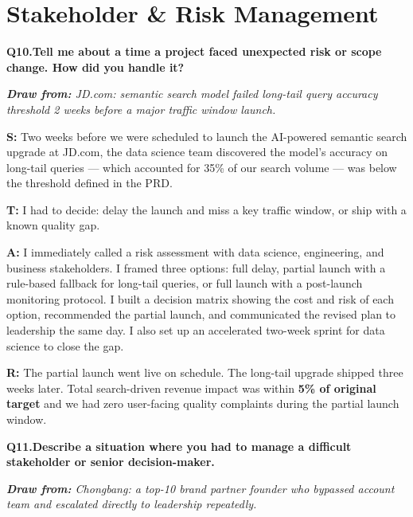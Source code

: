 \documentclass[10pt, letterpaper]{article}
\newcommand{\q}[2]{%
    \smallskip
    \noindent\textbf{\small Q#1.}\quad\textbf{#2}
    \vspace{3pt}
}
\newcommand{\hint}[1]{%
    \begin{notebox}
    \footnotesize\textit{\textbf{Draw from:} #1}
    \end{notebox}
}
\newcommand{\s}[1]{\textbf{\textcolor{starlabel}{S:}} #1}
\newcommand{\ta}[1]{\textbf{\textcolor{starlabel}{T:}} #1}
\newcommand{\ac}[1]{\textbf{\textcolor{starlabel}{A:}} #1}
\newcommand{\res}[1]{\textbf{\textcolor{starlabel}{R:}} #1}
\begin{document}
\section{Stakeholder \& Risk Management}

\q{10}{Tell me about a time a project faced unexpected risk or scope change. How did you handle it?}
\hint{JD.com: semantic search model failed long-tail query accuracy threshold 2 weeks before a major traffic window launch.}

\begin{answerbox}
\footnotesize
\s{Two weeks before we were scheduled to launch the AI-powered semantic search upgrade at JD.com, the data science team discovered the model's accuracy on long-tail queries --- which accounted for 35\% of our search volume --- was below the threshold defined in the PRD.}

\medskip
\ta{I had to decide: delay the launch and miss a key traffic window, or ship with a known quality gap.}

\medskip
\ac{I immediately called a risk assessment with data science, engineering, and business stakeholders. I framed three options: full delay, partial launch with a rule-based fallback for long-tail queries, or full launch with a post-launch monitoring protocol. I built a decision matrix showing the cost and risk of each option, recommended the partial launch, and communicated the revised plan to leadership the same day. I also set up an accelerated two-week sprint for data science to close the gap.}

\medskip
\res{The partial launch went live on schedule. The long-tail upgrade shipped three weeks later. Total search-driven revenue impact was within \textbf{5\% of original target} and we had zero user-facing quality complaints during the partial launch window.}
\end{answerbox}

\q{11}{Describe a situation where you had to manage a difficult stakeholder or senior decision-maker.}
\hint{Chongbang: a top-10 brand partner founder who bypassed account team and escalated directly to leadership repeatedly.}
\end{document}
